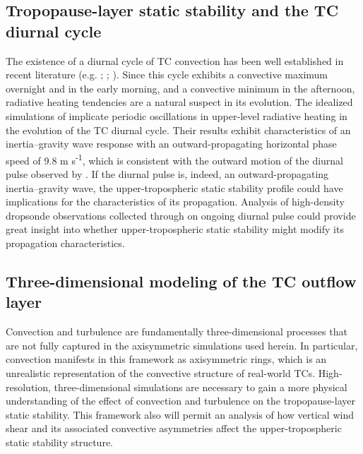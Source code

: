 \subsection{Tropopause-layer static stability and the TC diurnal cycle}

The existence of a diurnal cycle of TC convection has been well established in recent literature (e.g. \citeauthor{Kossin2002} \citeyear{Kossin2002}; \citeauthor{Dunionetal2014} \citeyear{Dunionetal2014}; \citeauthor{BowmanFowler2015} \citeyear{BowmanFowler2015}).
Since this cycle exhibits a convective maximum overnight and in the early morning, and a convective minimum in the afternoon, radiative heating tendencies are a natural suspect in its evolution.
The idealized simulations of \cite{NavarroHakim2016} implicate periodic oscillations in upper-level radiative heating in the evolution of the TC diurnal cycle.
Their results exhibit characteristics of an inertia--gravity wave response with an outward-propagating horizontal phase speed of 9.8 m s\textsuperscript{-1}, which is consistent with the outward motion of the diurnal pulse observed by \cite{Dunionetal2014}. If the diurnal pulse is, indeed, an outward-propagating inertia--gravity wave, the upper-tropospheric static stability profile could have implications for the characteristics of its propagation.
Analysis of high-density dropsonde observations collected through on ongoing diurnal pulse could provide great insight into whether upper-tropospheric static stability might modify its propagation characteristics.

\subsection{Three-dimensional modeling of the TC outflow layer}
Convection and turbulence are fundamentally three-dimensional processes that are not fully captured in the axisymmetric simulations used herein.
In particular, convection manifests in this framework as axisymmetric rings, which is an unrealistic representation of the convective structure of real-world TCs.
High-resolution, three-dimensional simulations are necessary to gain a more physical understanding of the effect of convection and turbulence on the tropopause-layer static stability.
This framework also will permit an analysis of how vertical wind shear and its associated convective asymmetries affect the upper-tropospheric static stability structure.


